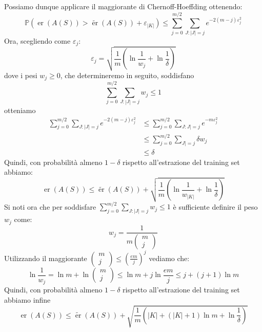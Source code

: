 \documentclass[\main/main.tex]{subfiles}
\begin{document}
\begin{analysis}
    \begin{multicols}{2}
        Possiamo dunque applicare il maggiorante di Chernoff-Hoeffding ottenendo:
        \[
            \mathbb{P}\left(\operatorname{er}(A(S))>\widetilde{\operatorname{er}}(A(S))+\varepsilon_{|K|}\right) \leq \sum_{j=0}^{m / 2} \sum_{J :|J|=j} e^{-2(m-j) \varepsilon_{j}^{2}}
        \]
        Ora, scegliendo come \(\varepsilon_j\):
        \[
            \varepsilon_{j}=\sqrt{\frac{1}{m}\left(\ln \frac{1}{w_{j}}+\ln \frac{1}{\delta}\right)}
        \]
        dove i pesi \(w_j \geq 0\), che determineremo in seguito, soddisfano
        \[
            \sum_{j=0}^{m / 2} \sum_{J :|J|=j} w_{j} \leq 1
        \]
        otteniamo
        \begin{align*} \sum_{j=0}^{m / 2} \sum_{J :|J|=j} e^{-2(m-j) \varepsilon_{j}^{2}} & \leq \sum_{j=0}^{m / 2} \sum_{J : J|=j} e^{-m \varepsilon_{j}^{2}} \\ & \leq \sum_{j=0}^{m / 2} \sum_{J |=j} \delta w_{j} \\ & \leq \delta \end{align*}
        Quindi, con probabilità almeno \(1-\delta\) rispetto all'estrazione del training set abbiamo:
        \[
            \operatorname{er}(A(S)) \leq \widetilde{\operatorname{er}}(A(S))+\sqrt{\frac{1}{m}\left(\ln \frac{1}{w_{|K|}}+\ln \frac{1}{\delta}\right)}
        \]
        Si noti ora che per soddisfare \(\sum_{j=0}^{m / 2} \sum_{J :|J|=j} w_{j} \leq 1\) è sufficiente definire il peso \(w_j\) come:
        \[
            w_{j}=\frac{1}{m \left( \begin{array}{c}{m} \\ {j}\end{array}\right)}
        \]
        Utilizzando il maggiorante \(\left( \begin{array}{c}{m} \\ {j}\end{array}\right) \leq\left(\frac{e m}{j}\right)^{j}\) vediamo che:
        \[
            \ln \frac{1}{w_{j}}=\ln m+\ln \left( \begin{array}{c}{m} \\ {j}\end{array}\right) \leq \ln m+j \ln \frac{e m}{j} \leq j+(j+1) \ln m
        \]
        Quindi, con probabilità almeno \(1-\delta\) rispetto all'estrazione del training set abbiamo infine
        \[
            \operatorname{er}(A(S)) \leq \widetilde{\operatorname{er}}(A(S))+\sqrt{\frac{1}{m}\left(|K|+(|K|+1) \ln m+\ln \frac{1}{\delta}\right)}
        \]
    \end{multicols}
\end{analysis}
\end{document}
